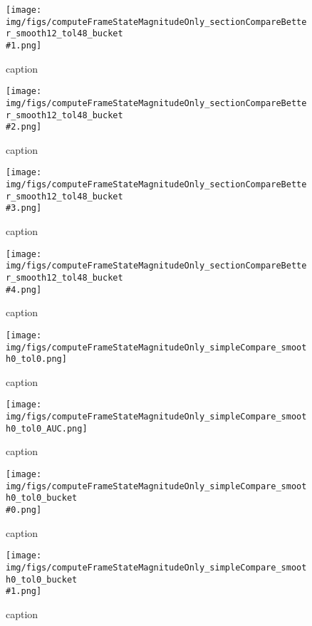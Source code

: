 %
\begin{figure}[!ht]
	\centering
	\texttt{[image: img/figs/computeFrameStateMagnitudeOnly\_sectionCompareBetter\_smooth12\_tol48\_bucket\\\#1.png]}
	\caption{caption}
	\label{fig:computeFrameStateMagnitudeOnly_sectionCompareBetter_smooth12_tol48_bucket\#1.png}
\end{figure}
%
\begin{figure}[!ht]
	\centering
	\texttt{[image: img/figs/computeFrameStateMagnitudeOnly\_sectionCompareBetter\_smooth12\_tol48\_bucket\\\#2.png]}
	\caption{caption}
	\label{fig:computeFrameStateMagnitudeOnly_sectionCompareBetter_smooth12_tol48_bucket\#2.png}
\end{figure}
%
\begin{figure}[!ht]
	\centering
	\texttt{[image: img/figs/computeFrameStateMagnitudeOnly\_sectionCompareBetter\_smooth12\_tol48\_bucket\\\#3.png]}
	\caption{caption}
	\label{fig:computeFrameStateMagnitudeOnly_sectionCompareBetter_smooth12_tol48_bucket\#3.png}
\end{figure}
%
\begin{figure}[!ht]
	\centering
	\texttt{[image: img/figs/computeFrameStateMagnitudeOnly\_sectionCompareBetter\_smooth12\_tol48\_bucket\\\#4.png]}
	\caption{caption}
	\label{fig:computeFrameStateMagnitudeOnly_sectionCompareBetter_smooth12_tol48_bucket\#4.png}
\end{figure}
%
\begin{figure}[!ht]
	\centering
	\texttt{[image: img/figs/computeFrameStateMagnitudeOnly\_simpleCompare\_smooth0\_tol0.png]}
	\caption{caption}
	\label{fig:computeFrameStateMagnitudeOnly_simpleCompare_smooth0_tol0.png}
\end{figure}
%
\begin{figure}[!ht]
	\centering
	\texttt{[image: img/figs/computeFrameStateMagnitudeOnly\_simpleCompare\_smooth0\_tol0\_AUC.png]}
	\caption{caption}
	\label{fig:computeFrameStateMagnitudeOnly_simpleCompare_smooth0_tol0_AUC.png}
\end{figure}
%
\begin{figure}[!ht]
	\centering
	\texttt{[image: img/figs/computeFrameStateMagnitudeOnly\_simpleCompare\_smooth0\_tol0\_bucket\\\#0.png]}
	\caption{caption}
	\label{fig:computeFrameStateMagnitudeOnly_simpleCompare_smooth0_tol0_bucket\#0.png}
\end{figure}
%
\begin{figure}[!ht]
	\centering
	\texttt{[image: img/figs/computeFrameStateMagnitudeOnly\_simpleCompare\_smooth0\_tol0\_bucket\\\#1.png]}
	\caption{caption}
	\label{fig:computeFrameStateMagnitudeOnly_simpleCompare_smooth0_tol0_bucket\#1.png}
\end{figure}
